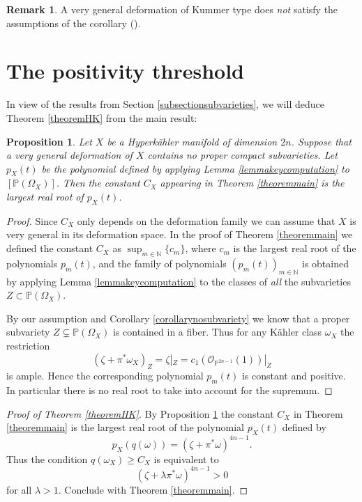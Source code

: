 \documentclass[JEP,XML,SOM,Unicode,NoEqCountersInSection,published]{cedram}
\let\mathcal\mathscr
\theoremstyle{plain}
\newtheorem{proposition}[theorem]{Proposition}
\theoremstyle{definition}
\newtheorem{remark}[theorem]{Remark}
\newcommand{\N}{\ensuremath{\mathbb{N}}}
\newcommand{\PP}{\ensuremath{\mathbb{P}}}
\newcommand\sO{{\mathcal O}}
\begin{document}
\begin{remark} \label{remarknosubvarieties2}
A very general deformation of Kummer type
does {\em not} satisfy the assumptions of the corollary (\cite[\S 6.1]{KV98I}).
\end{remark}

\section{The positivity threshold}
\label{sectionpositivity}

In view of the results from Section \ref{subsectionsubvarieties}, we will deduce
Theorem \ref{theoremHK} from the main result:

\begin{proposition}\label{propositionsegre}
Let $X$ be a Hyperkähler manifold of dimension $2n$. Suppose that
a very general deformation of $X$ contains no proper compact subvarieties.
Let $p_X(t)$ be the polynomial defined by applying Lemma \ref{lemmakeycomputation}
to $[\PP(\Omega_X)]$.
Then the constant $C_X$ appearing in Theorem \ref{theoremmain}
is the largest real root of $p_X(t)$.
\end{proposition} 

\begin{proof}
Since $C_X$ only depends on the deformation family we can assume that $X$ is very general in its deformation space.
In the proof of Theorem \ref{theoremmain} we defined the constant $C_X$ as
$\sup_{m \in \N} \{ c_m \}$, where $c_m$ is the largest real root
of the polynomials $p_m(t)$,
and the family of polynomials $(p_m(t))_{m \in \N}$ is obtained by applying
Lemma \ref{lemmakeycomputation} to the classes of {\em all} the subvarieties $Z \subset \PP(\Omega_X)$.

By our assumption and Corollary \ref{corollarynosubvariety} we know that a proper subvariety $Z \subsetneq \PP(\Omega_X)$
is contained in a fiber. Thus for any Kähler class $\omega_X$ the restriction
\[
(\zeta+\pi^* \omega_X)_Z = \zeta|_Z = c_1(\sO_{\PP^{2n-1}}(1))|_Z
\]
is ample. Hence the corresponding polynomial $p_m(t)$ is constant and positive. In particular there is no real root to take into account for the supremum.
\end{proof}

\begin{proof}[Proof of Theorem \ref{theoremHK}]
By Proposition \ref{propositionsegre} the constant $C_X$ in Theorem \ref{theoremmain} is the largest real root
of the polynomial $p_X(t)$ defined by
\[
p_X(q(\omega)) = (\zeta + \pi^* \omega)^{4n-1}.
\]
Thus the condition $q(\omega_X) \geq C_X$ is equivalent to
\[
(\zeta + \lambda \pi^* \omega)^{4n-1} > 0
\]
for all $\lambda > 1$. Conclude with Theorem \ref{theoremmain}.
\end{proof}
\end{document}
